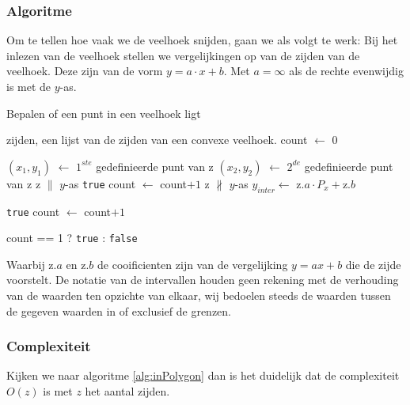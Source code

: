 \subsubsection{Algoritme}
Om te tellen hoe vaak we de veelhoek snijden, gaan we als volgt te werk:
Bij het inlezen van de veelhoek stellen we vergelijkingen op van de zijden van de 
veelhoek. Deze zijn van de vorm $y=a \cdot x+b$. Met $a = \infty$ als de rechte evenwijdig is met de $y$-as. 



	\begin{algorithm}[H]
	 	\caption{Bepalen of een punt in een veelhoek ligt}
		\begin{algorithmic}
		\Require zijden, een lijst van de zijden van een convexe veelhoek.
		\State count $\gets$ 0
		
		\State $(x_1,y_1)$ $\gets$ $1^{ste}$ gedefinieerde punt van z
		\State $(x_2,y_2)$ $\gets$ $2^{de}$ gedefinieerde punt van z
		 	\Comment z $\parallel$ $y$-as 
			\State \Return \texttt{true} 
				\State count $\gets$ count$+1$
			\EndIf
		\Else	\Comment z $\not \parallel$ $y$-as
			\State $y_{inter}  \gets$ z.$a\cdot P_x +$z.$b$
			
				\State \Return \texttt{true} 
				\State count $\gets$ count$+1$
			\EndIf
				
			\EndIf
		\EndIf	

		\EndFor		

		\Return count == 1 ? \texttt{true} : \texttt{false}
		\EndFunction
		\end{algorithmic}
		\label{alg:inPolygon}
	\end{algorithm}		

Waarbij z$.a$ en z$.b$ de cooificienten zijn van de vergelijking $y=ax+b$ die de zijde 
voorstelt. De notatie van de intervallen houden geen rekening met de verhouding van de waarden ten opzichte van elkaar, wij bedoelen steeds de waarden tussen de gegeven waarden in of exclusief de grenzen.

\subsubsection{Complexiteit}
Kijken we naar algoritme \ref{alg:inPolygon} dan is het duidelijk dat de complexiteit $O(z)$ is met $z$ het aantal zijden.

